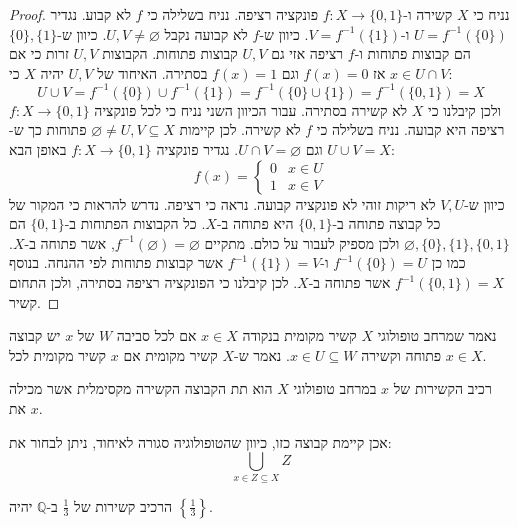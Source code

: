 \documentclass{tstextbook}
\begin{document}
\begin{proof}
נניח כי \(X\) קשירה ו-\(f:X\to \{ 0,1 \}\) פונקציה רציפה. נניח בשלילה כי \(f\) לא קבוע. נגדיר \(U=f^{-1}(\{ 0 \})\) ו-\(V=f^{-1}(\{ 1 \})\). כיוון ש-\(f\) לא קבועה נקבל \(U,V\neq \varnothing\). כיוון ש-\(\{ 0 \},\{ 1 \}\) הם קבוצות פתוחות ו-\(f\) רציפה אזי גם \(U,V\) קבוצות פתוחות. הקבוצות \(U,V\) זרות כי אם \(x \in U\cap V\) אז \(f(x)=0\) וגם \(f(x)=1\) בסתירה. האיחוד של \(U,V\) יהיה \(X\) כי:
$$U\cup  V=f^{-1} (\{ 0 \})\cup  f^{-1} (\{ 1 \})=f^{-1} (\{ 0 \}\cup \{ 1 \})=f^{-1} (\{ 0,1 \})=X$$
ולכן קיבלנו כי \(X\) לא קשירה בסתירה.
עבור הכיוון השני נניח כי לכל פונקציה  \(f:X\to \{ 0,1 \}\) רציפה היא קבועה. נניח בשלילה כי \(f\) לא קשירה. לכן קיימות \(\varnothing\neq U,V\subseteq X\) פתוחות כך ש-\(U\cup V=X\) וגם \(U\cap V=\varnothing\). נגדיר פונקציה \(f:X\to \{ 0,1 \}\) באופן הבא:
$$f(x)=\begin{cases}0 & x \in U \\1 & x \in V
\end{cases}$$
כיוון ש-\(V,U\) לא ריקות זוהי לא פונקציה קבועה. נראה כי רציפה. נדרש להראות כי המקור של כל קבוצה פתוחה ב-\(\{ 0,1 \}\) היא פתוחה ב-\(X\). כל הקבוצות הפתוחות ב-\(\{ 0,1 \}\) הם \(\varnothing,\{ 0 \},\{ 1 \},\{ 0,1 \}\) ולכן מספיק לעבור על כולם. מתקיים \(f^{-1}(\varnothing)=\varnothing\), אשר פתוחה ב-\(X\). כמו כן \(f^{-1}(\{ 0 \})=U\) ו-\(f^{-1}(\{ 1 \})=V\) אשר קבוצות פתוחות לפי ההנחה. בנוסף \(f^{-1}(\{ 0,1 \})=X\) אשר פתוחה ב-\(X\). לכן קיבלנו כי הפונקציה רציפה בסתירה, ולכן התחום קשיר.

\end{proof}
\begin{definition}
נאמר שמרחב טופולוגי \(X\) קשיר מקומית בנקודה \(x \in X\) אם לכל סביבה \(W\) של \(x\) יש קבוצה פתוחה וקשירה \(x \in U \subseteq W\). נאמר ש-\(X\) קשיר מקומית אם \(x\) קשיר מקומית לכל \(x \in X\).

\end{definition}
\begin{definition}
רכיב הקשירות של \(x\) במרחב טופולוגי \(X\) הוא תת הקבוצה הקשירה מקסימלית אשר מכילה את \(x\).

\end{definition}
\begin{remark}
אכן קיימת קבוצה כזו, כיוון שהטופולוגיה סגורה לאיחוד, ניתן לבחור את:
$$\bigcup_{x \in Z\subseteq X} Z$$

\end{remark}
\begin{example}
הרכיב קשירות של \(\frac{1}{3}\) ב-\(\mathbb{Q}\) יהיה \(\left\{  \frac{1}{3}  \right\}\).

\end{example}
\end{document}
